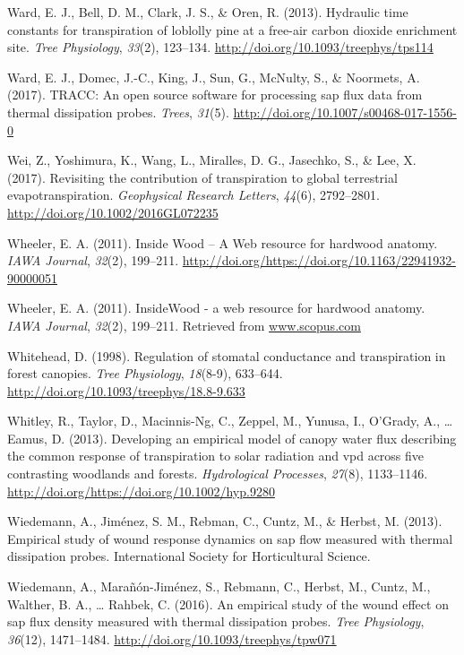 \documentclass[11pt,twoside]{reedthesis}
\begin{document}
\hypertarget{ref-Ward2013}{}
Ward, E. J., Bell, D. M., Clark, J. S., \& Oren, R. (2013). Hydraulic
time constants for transpiration of loblolly pine at a free-air carbon
dioxide enrichment site. \emph{Tree Physiology}, \emph{33}(2), 123--134.
\url{http://doi.org/10.1093/treephys/tps114}

\hypertarget{ref-Ward2017}{}
Ward, E. J., Domec, J.-C., King, J., Sun, G., McNulty, S., \& Noormets,
A. (2017). TRACC: An open source software for processing sap flux data
from thermal dissipation probes. \emph{Trees}, \emph{31}(5).
\url{http://doi.org/10.1007/s00468-017-1556-0}

\hypertarget{ref-Wei2017}{}
Wei, Z., Yoshimura, K., Wang, L., Miralles, D. G., Jasechko, S., \& Lee,
X. (2017). Revisiting the contribution of transpiration to global
terrestrial evapotranspiration. \emph{Geophysical Research Letters},
\emph{44}(6), 2792--2801. \url{http://doi.org/10.1002/2016GL072235}

\hypertarget{ref-insidewood}{}
Wheeler, E. A. (2011). Inside Wood -- A Web resource for hardwood
anatomy. \emph{IAWA Journal}, \emph{32}(2), 199--211.
\url{http://doi.org/https://doi.org/10.1163/22941932-90000051}

\hypertarget{ref-Wheeler2011}{}
Wheeler, E. A. (2011). InsideWood - a web resource for hardwood anatomy.
\emph{IAWA Journal}, \emph{32}(2), 199--211. Retrieved from
\url{www.scopus.com}

\hypertarget{ref-Whitehead1998}{}
Whitehead, D. (1998). Regulation of stomatal conductance and
transpiration in forest canopies. \emph{Tree Physiology},
\emph{18}(8-9), 633--644.
\url{http://doi.org/10.1093/treephys/18.8-9.633}

\hypertarget{ref-Whitley2013}{}
Whitley, R., Taylor, D., Macinnis-Ng, C., Zeppel, M., Yunusa, I.,
O'Grady, A., \ldots{} Eamus, D. (2013). Developing an empirical model of
canopy water flux describing the common response of transpiration to
solar radiation and vpd across five contrasting woodlands and forests.
\emph{Hydrological Processes}, \emph{27}(8), 1133--1146.
\url{http://doi.org/https://doi.org/10.1002/hyp.9280}

\hypertarget{ref-Wiedemann2013}{}
Wiedemann, A., Jiménez, S. M., Rebman, C., Cuntz, M., \& Herbst, M.
(2013). Empirical study of wound response dynamics on sap flow measured
with thermal dissipation probes. International Society for Horticultural
Science.

\hypertarget{ref-Wiedemann2016}{}
Wiedemann, A., Marañón-Jiménez, S., Rebmann, C., Herbst, M., Cuntz, M.,
Walther, B. A., \ldots{} Rahbek, C. (2016). An empirical study of the
wound effect on sap flux density measured with thermal dissipation
probes. \emph{Tree Physiology}, \emph{36}(12), 1471--1484.
\url{http://doi.org/10.1093/treephys/tpw071}
\end{document}
